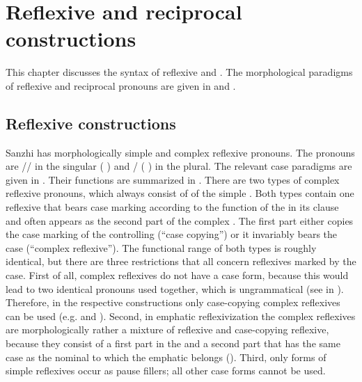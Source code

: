 \chapter{Reflexive and reciprocal constructions}
\label{cpt:Reflexive and reciprocal constructions}

This chapter discusses the syntax of reflexive and . The morphological paradigms of reflexive and reciprocal pronouns are given in  and .



\section{Reflexive constructions}
\label{sec:Reflexive constructions}

Sanzhi has morphologically simple and complex reflexive pronouns. The pronouns are \slash{}\slash{} in the singular ( ) and \slash{} ( ) in the plural. The relevant case paradigms are given in . Their functions are summarized in . There are two types of complex reflexive pronouns, which always consist of  of the simple . Both types contain one reflexive that bears case marking according to the function of the  in its clause and often appears as the second part of the complex . The first part either copies the case marking of the controlling  (``case copying'') or it invariably bears the  case (``complex  reflexive''). The functional range of both types is roughly identical, but there are three restrictions that all concern reflexives marked by the  case. First of all, complex  reflexives do not have a  case form, because this would lead to two identical pronouns used together, which is ungrammatical (see  in ). Therefore, in the respective constructions only case-copying complex reflexives can be used (e.g.  and ). Second, in emphatic reflexivization the complex reflexives are morphologically rather a mixture of  reflexive and case-copying reflexive, because they consist of a first part in the  and a second part that has the same case as the nominal to which the emphatic belongs (). Third, only  forms of simple reflexives occur as pause fillers; all other case forms cannot be used.

